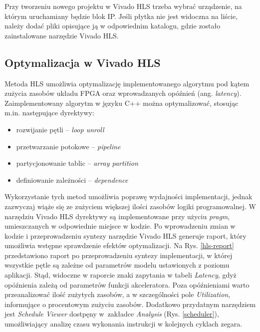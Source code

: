 Przy tworzeniu nowego projektu w Vivado HLS trzeba wybrać 
urządzenie, na którym uruchamiany będzie blok IP. Jeśli płytka nie jest widoczna na 
liście, należy dodać pliki opisujące ją w odpowiednim katalogu, gdzie zostało 
zainstalowane narzędzie Vivado HLS.  


\subsection{Optymalizacja w Vivado HLS}

Metoda HLS umożliwia optymalizację implementowanego algorytmu pod kątem zużycia zasobów układu FPGA oraz wprowadzanych opóźnień (ang. \emph{latency}). Zaimplementowany algorytm w języku C++ można optymalizować, stosując m.in. następujące dyrektywy:
\begin{itemize}
  \item rozwijanie pętli -- \emph{loop unroll}
  \item przetwarzanie potokowe -- \emph{pipeline}
  \item partycjonowanie tablic -- \emph{array partition}
  \item definiowanie zależności -- \emph{dependence}
\end{itemize} 
Wykorzystanie tych metod umożliwia poprawę wydajności implementacji, jednak zazwyczaj wiąże się ze zużyciem większej ilości zasobów logiki programowalnej. W narzędziu Vivado HLS dyrektywy są implementowane przy użyciu \emph{pragm}, umieszczanych w odpowiednie miejsce w kodzie. Po wprowadzeniu zmian w kodzie i przeprowadzeniu syntezy narzędzie Vivado HLS generuje raport, który umożliwia wstępne sprawdzenie efektów optymalizacji. Na Rys. \ref{hls-report} przedstawiono raport po przeprowadzeniu syntezy implementacji, w której wszystkie pętle są zależne od parametrów modelu ustawionych z poziomu aplikacji. Stąd, widoczne w raporcie znaki zapytania w tabeli \emph{Latency}, gdyż opóźnienia zależą od parametrów funkcji akceleratora. Poza opóźnieniami warto przeanalizować ilość zużytych zasobów, a w szczególności pole \emph{Utilization}, informujące o procentowym zużyciu zasobów. Dodatkowo przydatnym narzędziem jest \emph{Schedule Viewer} dostpęny w~zakładce \emph{Analysis} (Rys. \ref{scheduler}), umożliwiający analizę czasu wykonania instrukcji w kolejnych cyklach zegara.

